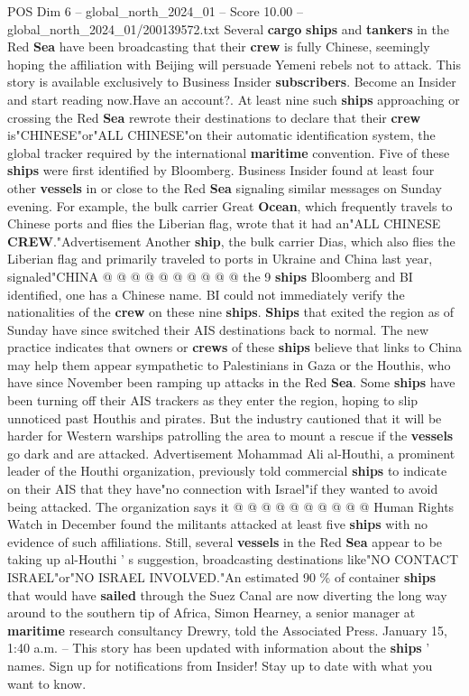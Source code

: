 \begin{textsample}{POS Dim 6 – global\_north\_2024\_01 – Score 10.00 – global\_north\_2024\_01/200139572.txt}  \label{ex:f6_pos_092}
Several \textbf{cargo} \textbf{ships} and \textbf{tankers} in the Red \textbf{Sea} have been broadcasting that their \textbf{crew} is fully Chinese, seemingly hoping the affiliation with Beijing will persuade Yemeni rebels not to attack.
This story is available exclusively to Business Insider \textbf{subscribers}.
Become an Insider and start reading now.Have an account?.
At least nine such \textbf{ships} approaching or crossing the Red \textbf{Sea} rewrote their destinations to declare that their \textbf{crew} is"CHINESE"or"ALL CHINESE"on their automatic identification system, the global tracker required by the international \textbf{maritime} convention.
Five of these \textbf{ships} were first identified by Bloomberg.
Business Insider found at least four other \textbf{vessels} in or close to the Red \textbf{Sea} signaling similar messages on Sunday evening.
For example, the bulk carrier Great \textbf{Ocean}, which frequently travels to Chinese ports and flies the Liberian flag, wrote that it had an"ALL CHINESE \textbf{CREW}."Advertisement Another \textbf{ship}, the bulk carrier Dias, which also flies the Liberian flag and primarily traveled to ports in Ukraine and China last year, signaled"CHINA @ @ @ @ @ @ @ @ @ @ the 9 \textbf{ships} Bloomberg and BI identified, one has a Chinese name.
BI could not immediately verify the nationalities of the \textbf{crew} on these nine \textbf{ships}. \textbf{Ships} that exited the region as of Sunday have since switched their AIS destinations back to normal.
The new practice indicates that owners or \textbf{crews} of these \textbf{ships} believe that links to China may help them appear sympathetic to Palestinians in Gaza or the Houthis, who have since November been ramping up attacks in the Red \textbf{Sea}.
Some \textbf{ships} have been turning off their AIS trackers as they enter the region, hoping to slip unnoticed past Houthis and pirates.
But the industry cautioned that it will be harder for Western warships patrolling the area to mount a rescue if the \textbf{vessels} go dark and are attacked.
Advertisement Mohammad Ali al-Houthi, a prominent leader of the Houthi organization, previously told commercial \textbf{ships} to indicate on their AIS that they have"no connection with Israel"if they wanted to avoid being attacked.
The organization says it @ @ @ @ @ @ @ @ @ @ Human Rights Watch in December found the militants attacked at least five \textbf{ships} with no evidence of such affiliations.
Still, several \textbf{vessels} in the Red \textbf{Sea} appear to be taking up al-Houthi ' s suggestion, broadcasting destinations like"NO CONTACT ISRAEL"or"NO ISRAEL INVOLVED."An estimated 90 \% of container \textbf{ships} that would have \textbf{sailed} through the Suez Canal are now diverting the long way around to the southern tip of Africa, Simon Hearney, a senior manager at \textbf{maritime} research consultancy Drewry, told the Associated Press.
January 15, 1:40 a.m. -- This story has been updated with information about the \textbf{ships} ' names.
Sign up for notifications from Insider!
Stay up to date with what you want to know.

\end{textsample}
